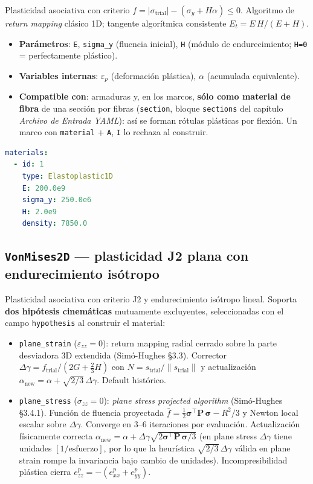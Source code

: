 \documentclass[11pt,oneside]{report}
\begin{document}
Plasticidad asociativa con criterio $f = |\sigma_{\text{trial}}| - (\sigma_y + H \alpha) \le 0$. Algoritmo de \textit{return mapping} clásico 1D; tangente algorítmica consistente $E_t = E\,H / (E + H)$.

\begin{itemize}
  \item \textbf{Parámetros}: \texttt{E}, \texttt{sigma\_y} (fluencia inicial), \texttt{H} (módulo de endurecimiento; \texttt{H=0} = perfectamente plástico).
  \item \textbf{Variables internas}: $\varepsilon_p$ (deformación plástica), $\alpha$ (acumulada equivalente).
  \item \textbf{Compatible con}: armaduras y, en los marcos, \textbf{sólo como material de fibra} de una sección por fibras (\texttt{section}, bloque \texttt{sections} del capítulo \textit{Archivo de Entrada YAML}): así se forman rótulas plásticas por flexión. Un marco con \texttt{material} + \texttt{A}, \texttt{I} lo rechaza al construir.
\end{itemize}

\begin{lstlisting}[language=yaml]
materials:
  - id: 1
    type: Elastoplastic1D
    E: 200.0e9
    sigma_y: 250.0e6
    H: 2.0e9
    density: 7850.0

\end{lstlisting}

\subsection{\texttt{VonMises2D} --- plasticidad J2 plana con endurecimiento isótropo}

Plasticidad asociativa con criterio J2 y endurecimiento isótropo lineal. Soporta \textbf{dos hipótesis cinemáticas} mutuamente excluyentes, seleccionadas con el campo \texttt{hypothesis} al construir el material:

\begin{itemize}
  \item \texttt{plane\_strain} ($\varepsilon_{zz} = 0$): return mapping radial cerrado sobre la parte desviadora 3D extendida (Simó-Hughes §3.3). Corrector $\Delta\gamma = f_{\text{trial}} / (2G + \tfrac{2}{3} H)$ con $N = s_{\text{trial}} / \lVert s_{\text{trial}}\rVert$ y actualización $\alpha_{\text{new}} = \alpha + \sqrt{2/3}\,\Delta\gamma$. Default histórico.
  \item \texttt{plane\_stress} ($\sigma_{zz} = 0$): \textit{plane stress projected algorithm} (Simó-Hughes §3.4.1). Función de fluencia proyectada $\bar f = \tfrac{1}{2}\boldsymbol\sigma^\top \mathbf P\,\boldsymbol\sigma - R^2/3$ y Newton local escalar sobre $\Delta\gamma$. Converge en 3--6 iteraciones por evaluación. Actualización físicamente correcta $\alpha_{\text{new}} = \alpha + \Delta\gamma\sqrt{2\boldsymbol\sigma^\top\!\mathbf P\,\boldsymbol\sigma / 3}$ (en plane stress $\Delta\gamma$ tiene unidades $[1/\text{esfuerzo}]$, por lo que la heurística $\sqrt{2/3}\,\Delta\gamma$ válida en plane strain rompe la invariancia bajo cambio de unidades). Incompresibilidad plástica cierra $e^p_{zz} = -(e^p_{xx} + e^p_{yy})$.
\end{itemize}
\end{document}
